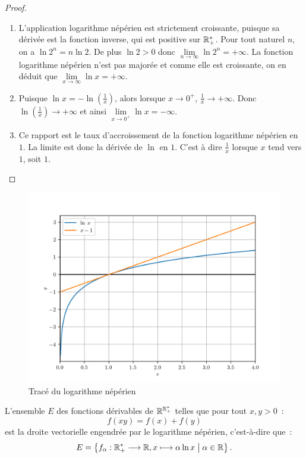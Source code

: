 \begin{proof}
  \begin{enumerate}
    \item L'application logarithme népérien est strictement croissante, puisque 
      sa dérivée est la fonction inverse, qui est positive sur \(\mathbb{R}_{+}^{*}\).  
      Pour tout naturel \(n\), on a \(\ln 2^n = n \ln 2\). De plus \(\ln 2 >0\) 
      donc \(\lim\limits_{n \to \infty} \ln 2^n = + \infty\). La fonction 
      logarithme népérien n'est pas majorée et comme elle est croissante, on en 
      déduit que \(\lim\limits_{x \to \infty} \ln x = +\infty\).
    \item Puisque \(\ln x = - \ln\left(\frac{1}{x}\right)\), alors lorsque 
      \(x\to 0^+\), \(\frac{1}{x} \to + \infty\). Donc \(\ln 
      \left(\frac{1}{x}\right) \to +\infty\) et ainsi \(\lim\limits_{x \to 0^+} 
      \ln x = - \infty\).
    \item Ce rapport est le taux d'accroissement de la fonction logarithme 
      népérien en \(1\). La limite est donc la dérivée de \(\ln\) en \(1\).
      C'est à dire \(\frac{1}{x}\) lorsque \(x\) tend vers \(1\), soit \(1\).
  \end{enumerate}
\end{proof}

\begin{figure}
  \centering
  \includegraphics[scale = 0.7]{lognep.png}
  \caption{Tracé du logarithme népérien}\label{fig:traceln}
\end{figure}

\begin{theo}
  L'ensemble \(E\) des fonctions dérivables de \(\mathbb{R}^{\mathbb{R}_{+}^{*}}\) telles que 
  pour tout \(x,y>0\)~:
  \begin{equation}\label{eq:fonclog}
    f(xy) = f(x)+f(y)
  \end{equation}
  est la droite vectorielle engendrée par le logarithme népérien, c'est-à-dire 
  que~:
  \[E = \left\{f_{\alpha}:\mathbb{R}_{+}^{*} \longrightarrow{} \mathbb{R}, x \longmapsto{} \alpha \ln x\mathrel{}\middle|\mathrel{}\alpha 
  \in \mathbb{R}\right\}.\]
\end{theo}

